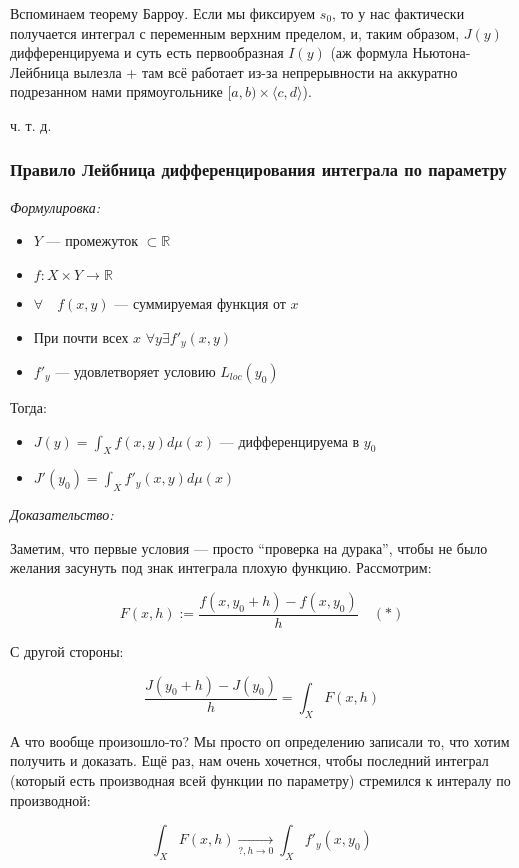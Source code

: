 \documentclass{article}
\def\dbl{\,\,}
\def\goesto#1{\underset{#1}{\longrightarrow}}
\begin{document}
Вспоминаем теорему Барроу. Если мы фиксируем $s_0$, то у нас фактически получается интеграл с переменным верхним пределом, и, таким образом, $J(y)$ дифференцируема и суть есть первообразная $I(y)$ (аж формула Ньютона-Лейбница вылезла + там всё работает из-за непрерывности на аккуратно подрезанном нами прямоугольнике $[a, b) \times \langle c, d \rangle$).

ч. т. д. 


\subsubsection{Правило Лейбница дифференцирования интеграла по параметру}
\textit{Формулировка:}

\begin{itemize}
    \item $Y$ --- промежуток $\subset \mathbb{R}$
    \item $f: X \times Y \rightarrow \mathbb{R}$
    \item $\forall \quad f(x, y)$ --- суммируемая функция от $x$
    \item При почти всех $x \dbl \forall y \exists f'_y(x, y)$
    \item $f'_y$ --- удовлетворяет условию $L_{loc}(y_0)$
\end{itemize}

Тогда:

\begin{itemize}
    \item $J(y) = \int_{X} f(x, y) d\mu(x)$ --- дифференцируема в $y_0$
    \item $J'(y_0) = \int_{X} f'_y(x, y) d \mu(x)$
\end{itemize}

\textit{Доказательство:}

Заметим, что первые условия --- просто ``проверка на дурака'', чтобы не было желания засунуть под знак интеграла плохую функцию. Рассмотрим:

\[F(x, h) := \frac{f(x, y_0 + h) - f(x, y_0)}{h} \quad (*)\]

С другой стороны:

\[\frac{J(y_0 + h) - J(y_0)}{h} = \int_{X} F(x, h)\]

А что вообще произошло-то? Мы просто оп определению записали то, что хотим получить и доказать. Ещё раз, нам очень хочетнся, чтобы последний интеграл (который есть производная всей функции по параметру) стремился к интералу по производной:

\[\int_{X} F(x, h) \goesto{?, h \rightarrow 0} \int_{X} f'_y(x, y_0)\]
\end{document}

